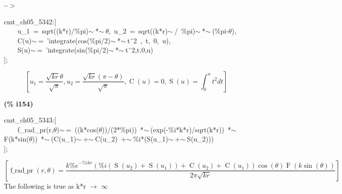 \documentclass[fleqn]{article}
\begin{document}
\noindent
\begin{minipage}[t]{4.000000em}\color{red}\bfseries
 --\ensuremath{\ensuremath{>}}	
\end{minipage}
\begin{minipage}[t]{\textwidth}\color{blue}
cmt\_ch05\_5342:[\\
\ \ \ \ u\_1\ =\ sqrt((k*r)/\%pi)\ensuremath{\sim\ }*\ensuremath{\sim\ }\ensuremath{\theta},\ u\_2\ =\ sqrt((k*r)\ensuremath{\sim\ }/\ \%pi)\ensuremath{\sim\ }*\ensuremath{\sim\ }(\%pi-\ensuremath{\theta}),\\
\ \ \ \ C(u)\ensuremath{\sim\ }=\ 'integrate(cos(\%pi/2)\ensuremath{\sim\ }*\ensuremath{\sim\ }t\^\ 2\ ,\ t,\ 0,\ u),\\
\ \ \ \ S(u)\ensuremath{\sim\ }=\ 'integrate(sin(\%pi/2)\ensuremath{\sim\ }*\ensuremath{\sim\ }t\^\ 2,t,0,u)\\
];
\end{minipage}
\[\displaystyle \tag{\% o144} 
\left[ {u_1}=\frac{\sqrt{k r} \theta }{\sqrt{\ensuremath{\pi} }}\operatorname{,}{u_2}=\frac{\sqrt{k r} \left( \ensuremath{\pi} -\theta \right) }{\sqrt{\ensuremath{\pi} }}\operatorname{,}\operatorname{C}(u)=0\operatorname{,}\operatorname{S}(u)=\int_{0}^{u}{\left. {{t}^{2}}dt\right.}\right] \mbox{}
\]


\noindent
\begin{minipage}[t]{4.000000em}\color{red}\bfseries
(\% i154)	
\end{minipage}
\begin{minipage}[t]{\textwidth}\color{blue}
cmt\_ch05\_5343:[\\
\ \ \ \ f\_rad\_pr(r,\ensuremath{\theta})\ensuremath{\sim\ }=\ ((k*cos(\ensuremath{\theta}))/(2*\%pi))\ *\ensuremath{\sim\ }(exp(-\%i*k*r)/sqrt(k*r))\ *\ensuremath{\sim\ }F(k*sin(\ensuremath{\theta}))\ *\ensuremath{\sim\ }(C(u\_1)\ensuremath{\sim\ }+\ensuremath{\sim\ }C(u\_2)\ +\ensuremath{\sim\ }\%i*(S(u\_1)\ensuremath{\sim\ }+\ensuremath{\sim\ }S(u\_2)))\\
];
\end{minipage}
\[\displaystyle \tag{\% o154} 
\left[ \operatorname{f\_ rad\_ pr}\left( r\operatorname{,}\theta \right) =\frac{k {{\% e}^{-\% i k r}} \left( \% i \left( \operatorname{S}\left( {u_2}\right) +\operatorname{S}\left( {u_1}\right) \right) +\operatorname{C}\left( {u_2}\right) +\operatorname{C}\left( {u_1}\right) \right)  \cos{\left( \theta \right) } \operatorname{F}\left( k \sin{\left( \theta \right) }\right) }{2 \ensuremath{\pi}  \sqrt{k r}}\right] \mbox{}
\]
The following is true as k*r \ensuremath{\longrightarrow} \ensuremath{\infty}
\end{document}
